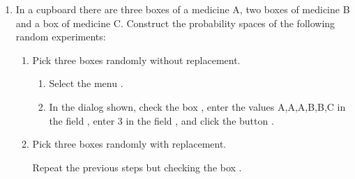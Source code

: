 \begin{enumerate}[leftmargin=*]
\item In a cupboard there are three boxes of a medicine A, two boxes of medicine B and a box of medicine C. 
Construct the probability spaces of the following random experiments:
\begin{enumerate}
\item Pick three boxes randomly without replacement. 
\begin{indication}
\begin{enumerate}
\item Select the menu .
\item In the dialog shown, check the box , enter the values A,A,A,B,B,C in the field , enter 3 in the field , and click the button .
\end{enumerate}
\end{indication}

\item Pick three boxes randomly with replacement. 
\begin{indication}
Repeat the previous steps but checking the box .
\end{indication}
\end{enumerate}


\end{enumerate}

